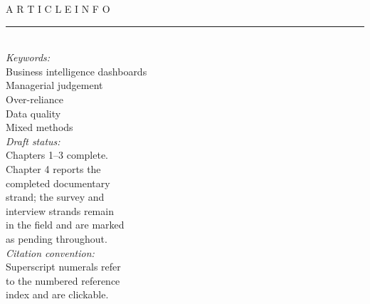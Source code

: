 \documentclass[11pt,a4paper]{article}
\numberwithin{figure}{section}
\numberwithin{table}{section}
\begin{document}
\noindent
\begin{minipage}[t]{0.27\textwidth}
{\footnotesize\sffamily A R T I C L E \; I N F O}\\[2pt]
\rule{\linewidth}{0.4pt}\\[4pt]
{\footnotesize\itshape Keywords:}\\[2pt]
{\footnotesize
Business intelligence dashboards\\
Managerial judgement\\
Over-reliance\\
Data quality\\
Mixed methods\\[8pt]}
{\footnotesize\itshape Draft status:}\\[2pt]
{\footnotesize
Chapters 1--3 complete.\\
Chapter 4 reports the\\
completed documentary\\
strand; the survey and\\
interview strands remain\\
in the field and are marked\\
as pending throughout.\\[8pt]}
{\footnotesize\itshape Citation convention:}\\[2pt]
{\footnotesize
Superscript numerals refer\\
to the numbered reference\\
index and are clickable.}
\end{minipage}\hfill
\end{document}
